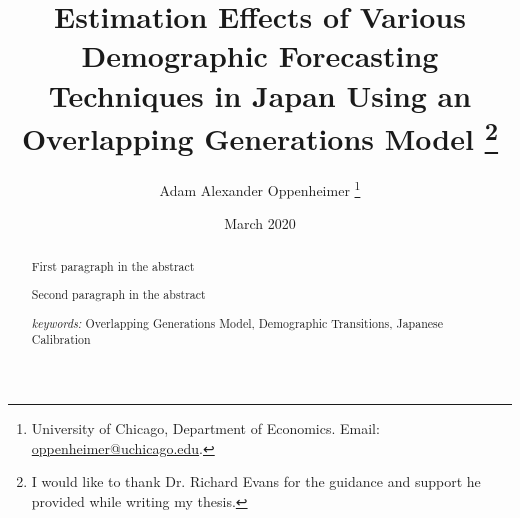 \documentclass{article}
\renewcommand{\thesection}{\Roman{section}}
\numberwithin{equation}{subsection}
\renewcommand{\section}[2][]{\oldsection[#1]{#2}\index{#1}\label{sec:\thesection}}
\begin{document}



\begin{titlepage}
\title{Estimation Effects of Various Demographic Forecasting Techniques in Japan Using an Overlapping Generations Model 
         \thanks{I would like to thank Dr. Richard Evans for the guidance and support he provided while writing my thesis.}
      }
\author{
   Adam Alexander Oppenheimer
   \footnote{University of Chicago,
      Department of Economics. Email:
      \href{mailto:oppenheimer@uchicago.edu}
      {oppenheimer@uchicago.edu}.
   }
}
\date{March 2020 \\
   \scriptsize{}}
\maketitle
\vspace{-9mm}
\begin{abstract}
\small{First paragraph in the abstract
\par Second paragraph in the abstract

\vspace{3mm}

\noindent\textit{keywords:}\:
   Overlapping Generations Model,
   Demographic Transitions,
   Japanese Calibration

\vspace{3mm}

}

\end{abstract}
\thispagestyle{empty}
\end{titlepage}

\end{document}
